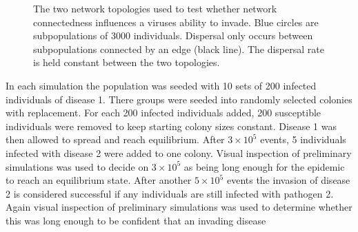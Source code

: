 \begin{figure}[t]
{\centering 
{}
}
\caption[Network topologies used to compare network connectedness]{
The two network topologies used to test whether network connectedness influences a viruses ability to invade. 
Blue circles are subpopulations of 3000 individuals.
Dispersal only occurs between subpopulations connected by an edge (black line).
The dispersal rate is held constant between the two topologies.
}
\label{f:net}
\end{figure}















In each simulation the population was seeded with 10 sets of 200 infected individuals of disease 1.
There groups were seeded into randomly selected colonies with replacement.
For each 200 infected individuals added, 200 susceptible individuals were removed to keep starting colony sizes constant. 
Disease 1 was then allowed to spread and reach equilibrium. 
After \ensuremath{3\times 10^{5}} events, 5 individuals infected with disease 2 were added to one colony. 
Visual inspection of preliminary simulations was used to decide on \ensuremath{3\times 10^{5}} as being long enough for the epidemic to reach an equilibrium state.
After another \ensuremath{5\times 10^{5}} events the invasion of disease 2 is considered successful if any individuals are still infected with pathogen 2.
Again visual inspection of preliminary simulations was used to determine whether this was long enough to be confident that an invading disease 


